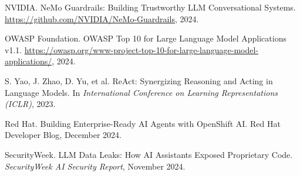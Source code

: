 \documentclass[11pt]{article}
\begin{document}
\begin{thebibliography}{25}
NVIDIA.
\newblock NeMo Guardrails: Building Trustworthy LLM Conversational Systems.
\newblock \url{https://github.com/NVIDIA/NeMo-Guardrails}, 2024.

OWASP Foundation.
\newblock OWASP Top 10 for Large Language Model Applications v1.1.
\newblock \url{https://owasp.org/www-project-top-10-for-large-language-model-applications/}, 2024.

S. Yao, J. Zhao, D. Yu, et al.
\newblock ReAct: Synergizing Reasoning and Acting in Language Models.
\newblock In \emph{International Conference on Learning Representations (ICLR)}, 2023.

Red Hat.
\newblock Building Enterprise-Ready AI Agents with OpenShift AI.
\newblock Red Hat Developer Blog, December 2024.

SecurityWeek.
\newblock LLM Data Leaks: How AI Assistants Exposed Proprietary Code.
\newblock \emph{SecurityWeek AI Security Report}, November 2024.

\end{thebibliography}
\end{document}
